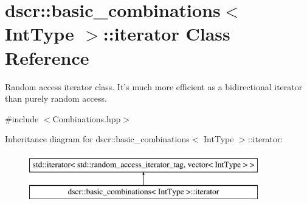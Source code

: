 \hypertarget{classdscr_1_1basic__combinations_1_1iterator}{\section{dscr\-:\-:basic\-\_\-combinations$<$ Int\-Type $>$\-:\-:iterator Class Reference}
\label{classdscr_1_1basic__combinations_1_1iterator}
}


Random access iterator class. It's much more efficient as a bidirectional iterator than purely random access.  




{\ttfamily \#include $<$Combinations.\-hpp$>$}

Inheritance diagram for dscr\-:\-:basic\-\_\-combinations$<$ Int\-Type $>$\-:\-:iterator\-:\begin{figure}[H]
\begin{center}
\leavevmode
\includegraphics[height=2.000000cm]{classdscr_1_1basic__combinations_1_1iterator}
\end{center}
\end{figure}
